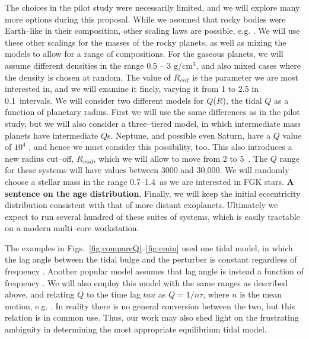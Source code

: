 The choices in the pilot study were necessarily limited, and we will
explore many more options during this proposal.  While we assumed that
rocky bodies were Earth--like in their composition, other scaling laws
are possible, e.g.  \cite{Seager07,Fortney07,Lissauer11}.  We will use
these other scalings for the masses of the rocky planets, as well as
mixing the models to allow for a range of compositions.  For the
gaseous planets, we will assume different densities in the range 0.5
-- 3 g/cm$^3$, and also mixed cases where the density is chosen at
random.  The value of $R_{crit}$ is the parameter we are most
interested in, and we will examine it finely, varying it from 1 to 2.5
\rearth in 0.1~\rearth intervals.  We will consider two different
models for $Q$($R$), the tidal $Q$ as a function of planetary radius.
First we will use the same differences as in the pilot study, but we
will also consider a three--tiered model, in which intermediate mass
planets have intermediate $Q$s.  Neptune, and possible even Saturn,
have a $Q$ value of $10^4$ \citep{ZhangHamliton07,Lainey12}, and hence we
must consider this possibility, too.  This also introduces a new
radius cut--off, $R_{mid}$, which we will allow to move from 2 to
5~\rearth.  The $Q$ range for these systems will have values between
3000 and 30,000.  We will randomly choose a stellar mass in the range
0.7--1.4~\msun as we are interested in FGK stars.  {\bf A sentence on
  the age distribution}. Finally, we will keep the initial
eccentricity distribution consistent with that of more distant
exoplanets.  Ultimately we expect to run several hundred of these
suites of systems, which is easily tractable on a modern multi--core
workstation.

The examples in Figs.~\ref{fig:compareQ}--\ref{fig:emin} used one
tidal model, in which the lag angle between the tidal bulge and the
perturber is constant regardless of frequency
\citep[e.g.][]{GoldreichSoter66,Jackson08}.  Another popular model
assumes that lag angle is instead a function of frequency
\citep[e.g.][]{Hut81,Matsumura10}.  We will also employ this model
with the same ranges as described above, and relating $Q$ to the time
lag $tau$ as $Q = 1/n\tau$, where $n$ is the mean motion, e.g.
\cite{Correia12}.  In reality there is no general conversion between
the two, but this relation is in common use.  Thus, our work may also
shed light on the frustrating ambiguity in determining the most
appropriate equilibrium tidal model.

\medskip
{\centerline{}}
\smallskip

